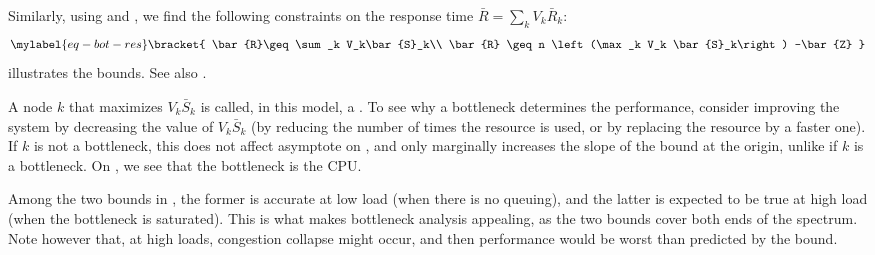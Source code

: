 Similarly, using  and
, we find the following
constraints on the response time $\bar{R}=\sum_k
V_k \bar{R}_k$:
\begin{equation}\mylabel{eq-bot-res}
  \bracket{
 \bar{R}\geq \sum_k V_k\bar{S}_k\\
 \bar{R} \geq n \left(\max_k V_k \bar{S}_k\right) -\bar{Z}
  }
\end{equation}
 illustrates the bounds. See
also .
%
\begin{figure}[!htbp]
\end{figure}
%

A node $k$ that maximizes $V_k \bar{S}_k$ is
called, in this model, a . To see
why a bottleneck determines the performance,
consider improving the system by decreasing the
value of $V_k \bar{S}_k$ (by reducing the number
of times the resource is used, or by replacing
the resource by a faster one). If $k$ is not a
bottleneck, this does not affect asymptote on
, and only marginally
increases the slope of the bound at the origin,
unlike if $k$ is a bottleneck. On
, we see that the bottleneck
is the CPU.

Among the two bounds in , the former is
accurate at low load (when there is no queuing), and the latter
is expected to be true at high load (when the bottleneck is
saturated). This is what makes bottleneck analysis appealing,
as the two bounds cover both ends of the spectrum. Note however
that, at high loads, congestion collapse might occur, and then
performance would be worst than
predicted by the bound.%
%
%


